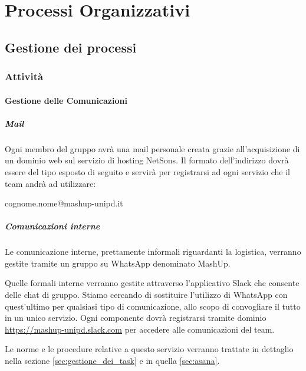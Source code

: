 
\section{Processi Organizzativi}

	\subsection{Gestione dei processi}
		\subsubsection{Attività}
			\paragraph{Gestione delle Comunicazioni}
					\subparagraph{Mail}
					\label{sec:mail}
					Ogni membro del gruppo avrà una mail personale creata grazie all'acquisizione di un dominio web sul servizio di hosting NetSons. \newline
					Il formato dell'indirizzo dovrà essere del tipo esposto di seguito e servirà per registrarsi ad ogni servizio che il team andrà ad utilizzare:
						\begin{center}
							cognome.nome@mashup-unipd.it
						\end{center}
												
				\subparagraph{Comunicazioni interne}
				\label{sec:comunicazioni_interne}
				Le comunicazione interne, prettamente informali riguardanti la logistica, verranno gestite tramite un gruppo su WhatsApp denominato MashUp. \newline
				
				Quelle formali interne verranno gestite attraverso l'applicativo Slack che consente delle chat di gruppo. Stiamo cercando di sostituire l'utilizzo di WhatsApp con quest'ultimo per qualsiasi tipo di comunicazione, allo scopo di convogliare il tutto in un unico servizio. Ogni componente dovrà registrarsi tramite dominio \url{https://mashup-unipd.slack.com} per accedere alle comunicazioni del team.\newline
				
				Le norme e le procedure relative a questo servizio verranno trattate in dettaglio nella sezione \ref{sec:gestione_dei_task} e in quella \ref{sec:asana}. \newline
				
